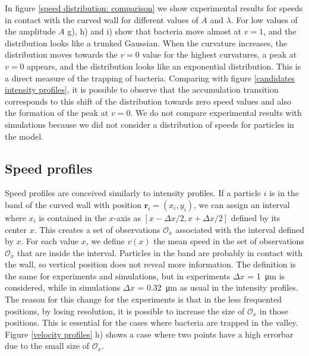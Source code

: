 
In figure \ref{speed distribution: comparison} we show experimental results for speeds in contact with the curved wall for different values of $A$ and $\lambda$. For low values of the amplitude $A$ g), h) and i) show that bacteria move almost at $v=1$, and the distribution looks like a trunked Gaussian. When the curvature increases, the distribution moves towards the $v=0$ value for the highest curvatures, a peak at $v=0$ appears, and the distribution looks like an exponential distribution. This is a direct measure of the trapping of bacteria. Comparing with figure \ref{candidates intensity profiles}, it is possible to observe that the accumulation transition corresponds to this shift of the distribution towards zero speed values and also the formation of the peak at $v=0$. We do not compare experimental results with simulations because we did not consider a distribution of speeds for particles in the model.

\subsection{Speed profiles}

Speed profiles are conceived similarly to intensity profiles. If a particle $i$ is in the band of the curved wall with position $\textbf{r}_i =(x_i, y_i)$, we can assign an interval where $x_i$ is contained in the $x$-axis as $[x-\Delta x/2,x+\Delta x/2]$ defined by its center $x$. This creates a set of observations $\mathcal{O}_x$ associated with the interval defined by $x$. For each value $x$, we define $v(x)$ the mean speed in the set of observations $\mathcal{O}_x$ that are inside the interval. Particles in the band are probably in contact with the wall, so vertical position does not reveal more information. The definition is the same for experiments and simulations, but in experiments $\Delta x $ = \SI{1}{\micro\meter} is considered, while in simulations $\Delta x $ = \SI{0.32}{\micro\meter} as usual in the intensity profiles. The reason for this change for the experiments is that in the less frequented positions, by losing resolution, it is possible to increase the size of $\mathcal{O}_x$ in those positions. This is essential for the cases where bacteria are trapped in the valley. Figure \ref{velocity profiles} h) shows a case where two points have a high errorbar due to the small size of $\mathcal{O}_x$.

